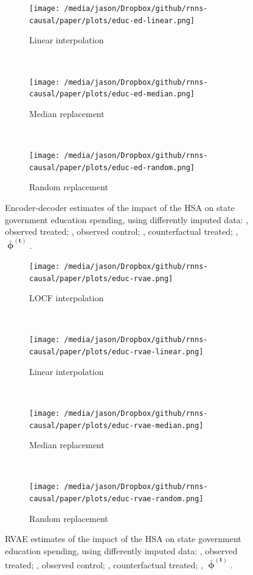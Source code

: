 \begin{figure}[htbp]
	\centering
	\begin{subfigure}[t]{0.43\textwidth}
		\centering
		\texttt{[image: /media/jason/Dropbox/github/rnns-causal/paper/plots/educ-ed-linear.png]}
		\caption{Linear interpolation} 
	\end{subfigure}
	~ 
	\begin{subfigure}[t]{0.43\textwidth}
		\centering
		\texttt{[image: /media/jason/Dropbox/github/rnns-causal/paper/plots/educ-ed-median.png]}
		\caption{Median replacement}
	\end{subfigure}
	~ 
	\begin{subfigure}[t]{0.43\textwidth}
		\centering
		\texttt{[image: /media/jason/Dropbox/github/rnns-causal/paper/plots/educ-ed-random.png]}
		\caption{Random replacement}
	\end{subfigure}
	\caption{Encoder-decoder estimates of the impact of the HSA on state government education spending, using differently imputed data:		{\color{Darjeeling15}{\sampleline{}}}, observed treated;
		{}, observed control;
		{}, counterfactual treated;
		{}, $\boldsymbol{\bar{\upphi}^{(t)}}$.\label{educ-ed-imp}}
\end{figure}

\begin{figure}[htbp]
	\centering
	\begin{subfigure}[t]{0.43\textwidth}
		\centering
		\texttt{[image: /media/jason/Dropbox/github/rnns-causal/paper/plots/educ-rvae.png]}
		\caption{LOCF interpolation} 
	\end{subfigure}
	~ 
	\begin{subfigure}[t]{0.43\textwidth}
		\centering
		\texttt{[image: /media/jason/Dropbox/github/rnns-causal/paper/plots/educ-rvae-linear.png]}
		\caption{Linear interpolation} 
	\end{subfigure}
	~ 
	\begin{subfigure}[t]{0.43\textwidth}
		\centering
		\texttt{[image: /media/jason/Dropbox/github/rnns-causal/paper/plots/educ-rvae-median.png]}
		\caption{Median replacement}
	\end{subfigure}
	~ 
	\begin{subfigure}[t]{0.43\textwidth}
		\centering
		\texttt{[image: /media/jason/Dropbox/github/rnns-causal/paper/plots/educ-rvae-random.png]}
		\caption{Random replacement}
	\end{subfigure}
	\caption{RVAE estimates of the impact of the HSA on state government education spending, using differently imputed data:		{\color{Darjeeling15}{\sampleline{}}}, observed treated;
		{}, observed control;
		{}, counterfactual treated;
		{}, $\boldsymbol{\bar{\upphi}^{(t)}}$.\label{educ-rvae-imp}}
\end{figure}

